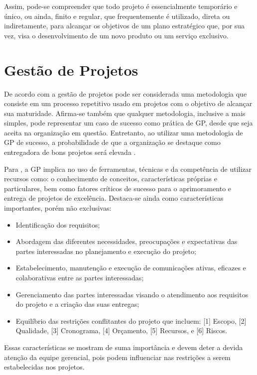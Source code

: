   Assim, pode-se compreender que todo projeto é essencialmente temporário e único, ou ainda, finito e regular, que frequentemente é utilizado, direta ou indiretamente, para alcançar os objetivos de um plano estratégico que, por sua vez, visa o desenvolvimento de um novo produto ou um serviço exclusivo.

\section{Gestão de Projetos}

  De acordo com  a gestão de projetos pode ser considerada uma metodologia que consiste em um processo repetitivo usado em projetos com o objetivo de alcançar sua maturidade. Afirma-se também que qualquer metodologia, inclusive a mais simples, pode representar um caso de sucesso como prática de GP, desde que seja aceita na organização em questão. Entretanto, ao utilizar uma metodologia de GP de sucesso, a probabilidade de que a organização se destaque como entregadora de bons projetos será elevada \cite{kerzner2013project}.

  Para , a GP implica no uso de ferramentas, técnicas e da competência de utilizar recursos como: o conhecimento de conceitos, características próprias e particulares, bem como fatores críticos de sucesso para o aprimoramento e entrega de projetos de excelência. Destaca-se ainda como características importantes, porém não exclusivas:

  \begin{itemize}
    \item Identificação dos requisitos;
    \item Abordagem das diferentes necessidades, preocupações e expectativas das partes interessadas no planejamento e execução do projeto;
    \item Estabelecimento, manutenção e execução de comunicações ativas, eficazes e colaborativas entre as partes interessadas;
    \item Gerenciamento das partes interessadas visando o atendimento aos requisitos do projeto e a criação das suas entregas;
    \item Equilíbrio das restrições conflitantes do projeto que incluem: [1] Escopo, [2] Qualidade, [3] Cronograma, [4] Orçamento, [5] Recursos, e [6] Riscos.
  \end{itemize}

  Essas características se mostram de suma importância e devem deter a devida atenção da equipe gerencial, pois podem influenciar nas restrições a serem estabelecidas nos projetos.

